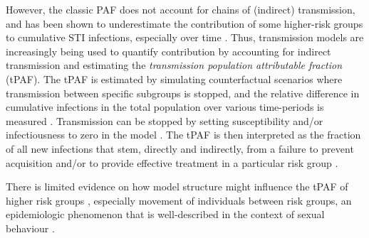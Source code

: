 However, the classic PAF does not account for chains of (indirect) transmission, and has been
shown to underestimate the contribution of some higher-risk groups to cumulative
STI infections, especially over time \citep{Mishra2014}.
Thus, transmission models are increasingly being used to quantify
contribution by accounting for indirect transmission and estimating
the \textit{transmission population attributable fraction} (tPAF).
The tPAF is estimated by
simulating counterfactual scenarios where transmission
between specific subgroups is stopped, and
the relative difference in cumulative infections in the total population
over various time-periods is measured \citep{Mishra2014,Mukandavire2018}.
Transmission can be stopped by
setting susceptibility and/or infectiousness to zero in the model \citep{Mishra2014}.
The tPAF is then interpreted as
the fraction of all new infections that stem, directly and indirectly, from
a failure to prevent acquisition and/or to provide effective treatment
in a particular risk group \citep{Mishra2016,Mukandavire2018,Maheu-Giroux2017}.
\par
There is limited evidence on how model structure 
might influence the tPAF of higher risk groups
\citep{Mishra2016,Mukandavire2018,Maheu-Giroux2017},
especially movement of individuals between risk groups,
an epidemiologic phenomenon  that is well-described
in the context of sexual behaviour \citep{Watts2010}.
